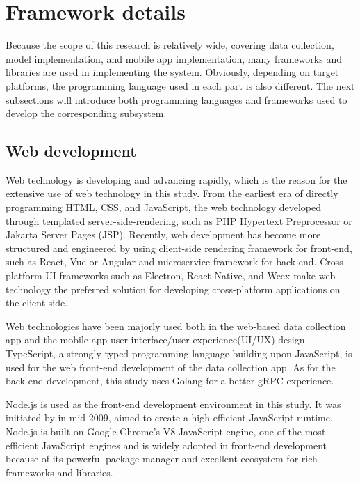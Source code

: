\makeatletter
\let\savedchap\@makechapterhead
\def\@makechapterhead{\vspace*{-2.8cm}\savedchap}
\chapter{Framework details}
\let\@makechapterhead\savedchap
\makeatother
\vspace*{-1em}
\label{chap:Framework details}
Because the scope of this research is relatively wide, covering data collection, model implementation, and mobile app implementation, many frameworks and libraries are used in implementing the system.
Obviously, depending on target platforms, the programming language used in each part is also different.
The next subsections will introduce both programming languages and frameworks used to develop the corresponding subsystem.

\section{Web development}
Web technology is developing and advancing rapidly, which is the reason for the extensive use of web technology in this study.
From the earliest era of directly programming HTML, CSS, and JavaScript, the web technology developed through templated server-side-rendering, such as PHP Hypertext Preprocessor or Jakarta Server Pages (JSP).
Recently, web development has become more structured and engineered by using client-side rendering framework for front-end, such as React, Vue or Angular and microservice framework for back-end.
Cross-platform UI frameworks such as Electron, React-Native, and Weex make web technology the preferred solution for developing cross-platform applications on the client side.

Web technologies have been majorly used both in the web-based data collection app and the mobile app user interface/user experience(UI/UX) design.
TypeScript, a strongly typed programming language building upon JavaScript, is used for the web front-end development of the data collection app.
As for the back-end development, this study uses Golang for a better gRPC experience.

Node.js is used as the front-end development environment in this study.
It was initiated by \citet{nodejs2021} in mid-2009, aimed to create a high-efficient JavaScript runtime.
Node.js is built on Google Chrome's V8 JavaScript engine, one of the most efficient JavaScript engines and is widely adopted in front-end development because of its powerful package manager and excellent ecosystem for rich frameworks and libraries.


